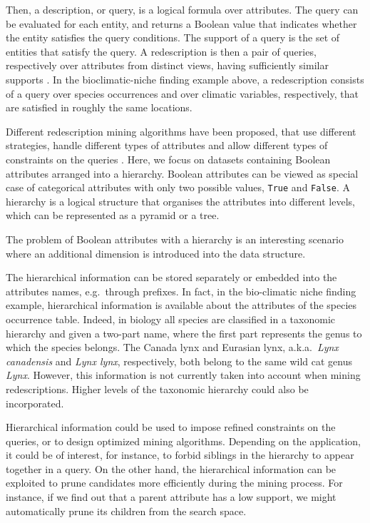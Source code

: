 \documentclass[12pt,a4paper]{article}
\begin{document}
Then, a description, or query, is a logical formula over attributes.
The query can be evaluated for each entity, and returns a Boolean value that indicates whether the entity satisfies the query conditions.
The support of a query is the set of entities that satisfy the query.
A redescription is then a pair of queries, respectively over attributes from distinct views, having sufficiently similar supports \cite{galbrun2018redescription}.
In the bioclimatic-niche finding example above, a redescription consists of a query over species occurrences and over climatic variables, respectively, that are satisfied in roughly the same locations.

Different redescription mining algorithms have been proposed, that use different strategies, handle different types of attributes and allow different types of constraints on the queries \cite{galbrun2018redescription}.
Here, we focus on datasets containing Boolean attributes arranged into a hierarchy.
Boolean attributes can be viewed as special case of categorical attributes with only two possible values, \texttt{True} and \texttt{False}.
A hierarchy is a logical structure that organises the attributes into different levels, which can be represented as a pyramid or a tree.

The problem of Boolean attributes with a hierarchy is an interesting scenario where an additional dimension is introduced into the data structure. 

The hierarchical information can be stored separately or embedded into the attributes names, e.g.\ through prefixes. 
In fact, in the bio-climatic niche finding example, hierarchical information is available about the attributes of the species occurrence table. Indeed, in biology all species are classified in a taxonomic hierarchy and given a two-part name, where the first part represents the genus to which the species belongs. The Canada lynx and Eurasian lynx, a.k.a.\ \textit{Lynx canadensis} and \textit{Lynx lynx}, respectively, both belong to the same wild cat genus \textit{Lynx}. However, this information is not currently taken into account when mining redescriptions. Higher levels of the taxonomic hierarchy could also be incorporated.

Hierarchical information could be used to impose refined constraints on the queries, or to design optimized mining algorithms. Depending on the application, it could be of interest, for instance, to forbid siblings in the hierarchy to appear together in a query.
On the other hand, the hierarchical information can be exploited to prune candidates more efficiently during the mining process. For instance, if we find out that a parent attribute has a low support, we might automatically prune its children from the search space.


\end{document}
